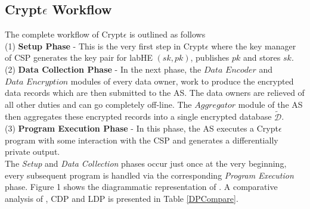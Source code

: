 \subsection{Crypt$\epsilon$ Workflow}
The complete workflow of Crypt$\epsilon$ is outlined as follows\\(1) \textbf{ Setup Phase} - This is the very first step in Crypt$\epsilon$ where the key manager of \textsf{CSP} generates the key pair for labHE $(sk,pk)$, publishes $pk$ and stores $sk$. \\(2) \textbf{ Data Collection Phase }- In the next phase, the $\textit{Data 
Encoder}$ and $\textit{Data Encryption}$ modules of every data owner, work to produce the encrypted data records which are then submitted to the \textsf{AS}. The data owners are relieved of all other duties and can go completely off-line. The $\textit{Aggregator}$ module of the \textsf{AS} then aggregates these encrypted records into a single encrypted database $\boldsymbol{\tilde{\mathcal{D}}}$. \\(3) \textbf{ Program Execution Phase} - In this phase, the \textsf{AS} executes a Crypt$\epsilon$ program with some interaction with the \textsf{CSP}  and generates a differentially private output.  \\
The \emph{Setup} and \emph{Data Collection} phases occur just once at the very beginning, every subsequent program  is handled via the corresponding  \emph{Program Execution} phase. Figure 1 shows the diagrammatic representation of \system. A comparative analysis of \system, \textsf{CDP} and \textsf{LDP} is presented in  Table \ref{DPCompare}.
